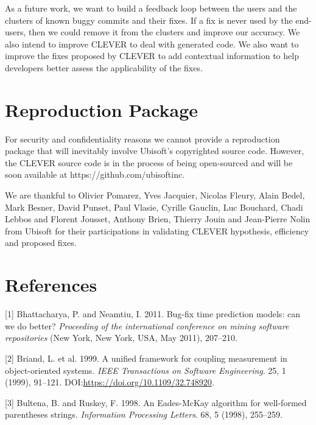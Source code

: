 \documentclass[sigconf]{acmart}
\begin{document}
As a future work, we want to build a feedback loop between the users and
the clusters of known buggy commits and their fixes. If a fix is never
used by the end-users, then we could remove it from the clusters and
improve our accuracy. We also intend to improve CLEVER to deal with
generated code. We also want to improve the fixes proposed by CLEVER to
add contextual information to help developers better assess the
applicability of the fixes.

\section{Reproduction Package}\label{reproduction-package}

For security and confidentiality reasons we cannot provide a
reproduction package that will inevitably involve Ubisoft's copyrighted
source code. However, the CLEVER source code is in the process of being
open-sourced and will be soon available at
https://github.com/ubisoftinc.

\begin{acks}
We are thankful to Olivier Pomarez, Yves Jacquier, Nicolas Fleury, Alain Bedel, Mark Besner, David Punset, Paul Vlasie, Cyrille Gauclin, Luc Bouchard, Chadi Lebbos and Florent Jousset, Anthony Brien, Thierry Jouin and Jean-Pierre Nolin from Ubisoft for their participations in validating CLEVER hypothesis, efficiency and proposed fixes.
\end{acks}

\section*{References}

\setlength{\parindent}{0pt}

\hypertarget{refs}{}
\hypertarget{ref-Bhattacharya2011}{}
{[}1{]} Bhattacharya, P. and Neamtiu, I. 2011. Bug-fix time prediction
models: can we do better? \emph{Proceeding of the international
conference on mining software repositories} (New York, New York, USA,
May 2011), 207--210.

\hypertarget{ref-Briand1999a}{}
{[}2{]} Briand, L. et al. 1999. A unified framework for coupling
measurement in object-oriented systems. \emph{IEEE Transactions on
Software Engineering}. 25, 1 (1999), 91--121.
DOI:\url{https://doi.org/10.1109/32.748920}.

\hypertarget{ref-bultena1998eades}{}
{[}3{]} Bultena, B. and Ruskey, F. 1998. An Eades-McKay algorithm for
well-formed parentheses strings. \emph{Information Processing Letters}.
68, 5 (1998), 255--259.
\end{document}
